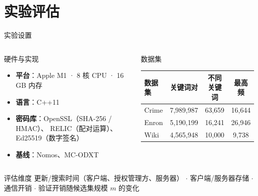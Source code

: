 \section{实验评估}

\begin{frame}{实验设置}

  \begin{columns}[T]
      \begin{block}{硬件与实现}
        \begin{itemize}
          \item \textbf{平台}：Apple M1 · 8 核 CPU · 16\,GB 内存
          \item \textbf{语言}：C++11
          \item \textbf{密码库}：OpenSSL（SHA-256 / HMAC）、
                RELIC（配对运算）、Ed25519（数字签名）
          \item \textbf{基线}：Nomos、MC-ODXT
        \end{itemize}
      \end{block}

      \begin{block}{数据集}
        \small
        \begin{tabular}{lccc}
          \toprule
          \textbf{数据集} & \textbf{关键词对} & \textbf{不同关键词} & \textbf{最高频} \\
          \midrule
          Crime   & 7,989,987 & 63,659 & 16,644 \\
          Enron   & 5,190,199 & 16,241 & 26,946 \\
          Wiki    & 4,565,948 & 10,000 &  9,738 \\
          \bottomrule
        \end{tabular}
      \end{block}
  \end{columns}

  \vspace{0.4em}
  \begin{exampleblock}{评估维度}
    更新/搜索时间（客户端、授权管理方、服务器）
    $\cdot$ 客户端/服务器存储
    $\cdot$ 通信开销
    $\cdot$ 验证开销随候选集规模 $m$ 的变化
  \end{exampleblock}

\end{frame}

